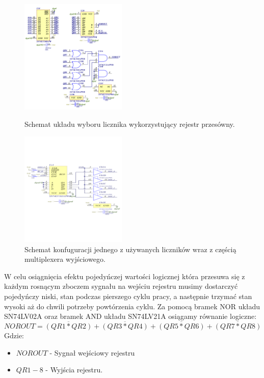 \documentclass[a4paper,12pt]{article}
\begin{document}
\begin{figure}
        \begin{multicols}{2}
                \includegraphics[width=0.45\textwidth]{shift_register.png}
                \caption{Schemat układu wyboru licznika wykorzystujący rejestr przesówny.}
                \label{wybor schema}
                \par
                \hfill
                \includegraphics[width=0.45\textwidth]{Licznik.png}
                \caption{Schemat konfuguracji jednego z używanych liczników wraz z częścią multiplexera wyjściowego.}
                \label{licznik}
                \par
                \hfill
        \end{multicols} 
\end{figure}

W celu osiągnięcia efektu pojedyńczej wartości logicznej która przesuwa się z każdym rosnącym zboczem sygnału na wejściu rejestru musimy dostarczyć pojedyńczy niski, stan podczas pierszego cyklu pracy, a następnie trzymać stan wysoki aż do chwili potrzeby powtórzenia cyklu. 
Za pomocą bramek NOR układu SN74LV02A oraz bramek AND układu SN74LV21A osiągamy równanie logiczne:
\begin{equation}
        NOROUT = \overline{(QR1*QR2)} + \overline{(QR3*QR4)} + \overline{(QR5*QR6)} + \overline{(QR7*QR8)}
\end{equation}
Gdzie:
\begin{itemize}
        \item $NOROUT$ - Sygnał wejściowy rejestru 
        \item $QR1-8$ - Wyjścia rejestru. 
\end{itemize}
\end{document}
